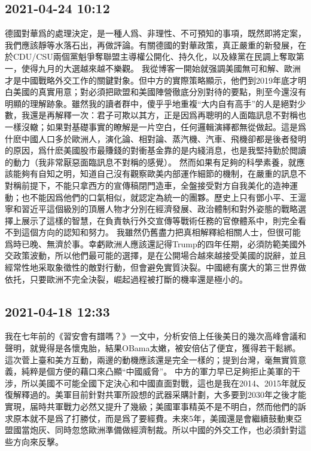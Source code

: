 \documentclass[twocolumn]{ctexart}
\begin{document}
\subsection*{2021-04-24 10:12}

德國對華爲的處理決定，是一種人爲、非理性、不可預知的事項，既然即將定案，我們應該靜等水落石出，再做評論。有關德國的對華政策，真正嚴重的新發展，在於CDU/CSU兩個黨魁爭奪聯盟主導權公開化、持久化，以及綠黨在民調上奪取第一，使得九月的大選越來越不樂觀。
我從博客一開始就强調美國無可和解、歐洲才是中國戰略外交工作的關鍵對象。但中方的實際策略顯示，他們到2019年底才明白美國的真實用意；對必須把歐盟和美國陣營徹底分別對待的要點，則至今還沒有明顯的理解跡象。雖然我的讀者群中，傻乎乎地重複“大内自有高手”的人是絕對少數，我還是再解釋一次：君子可欺以其方，正是因爲再聰明的人面臨訊息不對稱也一樣沒轍；如果對基礎事實的瞭解是一片空白，任何邏輯演繹都無從做起。這是爲什麽中國人口多於歐洲人，演化論、相對論、蒸汽機、汽車、飛機卻都是後者發明的原因，爲什麽美國股市最賺錢的對衝基金靠的是内綫消息，也是我堅持勤於閲讀的動力（我非常厭惡面臨訊息不對稱的感覺）。
然而如果有足夠的科學素養，就應該能夠有自知之明，知道自己沒有觀察歐美内部運作細節的機制，在嚴重的訊息不對稱前提下，不能只拿西方的宣傳稿閉門造車，全盤接受對方自我美化的造神運動；也不能因爲他們的口氣相似，就認定為統一的團夥。歷史上只有鄧小平、王滬寧和習近平這個級別的頂層人物才分別在經濟發展、政治體制和對外姿態的戰略選擇上展示了這樣的智慧，在負責執行外交宣傳等戰術任務的官僚體系中，則完全看不到這個方向的認知和努力。
我雖然仍舊盡力把真相解釋給相關人士，但很可能爲時已晚、無濟於事。幸虧歐洲人應該還記得Trump的四年任期，必須防範美國外交政策波動，所以他們最可能的選擇，是在公開場合越來越接受美國的説辭，並且經常性地采取象徵性的敵對行動，但會避免實質決裂。中國總有廣大的第三世界做依托，只要歐洲不完全決裂，崛起過程被打斷的機率還是極小的。
\subsection*{2021-04-18 12:33}

我在七年前的《習安會有譜嗎？》一文中，分析安倍上任後美日的幾次高峰會議和聲明，就覺得是各懷鬼胎，結果OBama太嫩，被安倍佔了便宜，獲得若干鬆綁。這次菅上臺和美方互動，兩邊的動機應該還是完全一樣的；提到台灣，毫無實質意義，純粹是個方便的藉口來凸顯“中國威脅”。
中方的軍力早已足夠拒止美軍的干涉，所以美國不可能全國下定決心和中國直面對戰，這也是我在2014、2015年就反復解釋過的。美軍目前針對共軍所設想的武器采購計劃，大多要到2030年之後才能實現，届時共軍戰力必然又提升了幾級；美國軍事精英不是不明白，然而他們的訴求原本就不是爲了打勝仗，而是爲了要經費。未來5年，美國還是會繼續鼓動東亞盟國當炮灰、同時忽悠歐洲準備做經濟制裁。所以中國的外交工作，也必須針對這些方向來反擊。
\end{document}
